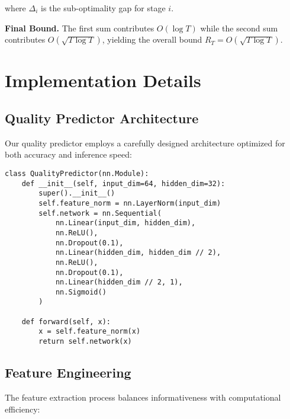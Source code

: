 \documentclass{article}
\theoremstyle{plain}
\theoremstyle{definition}
\theoremstyle{remark}
\begin{document}
where $\Delta_i$ is the sub-optimality gap for stage $i$.

\textbf{Final Bound.} The first sum contributes $O(\log T)$ while the second sum contributes $O(\sqrt{T \log T})$, yielding the overall bound $R_T = O(\sqrt{T \log T})$.

\section{Implementation Details}
\label{app:implementation}

\subsection{Quality Predictor Architecture}

Our quality predictor employs a carefully designed architecture optimized for both accuracy and inference speed:

\begin{verbatim}
class QualityPredictor(nn.Module):
    def __init__(self, input_dim=64, hidden_dim=32):
        super().__init__()
        self.feature_norm = nn.LayerNorm(input_dim)
        self.network = nn.Sequential(
            nn.Linear(input_dim, hidden_dim),
            nn.ReLU(),
            nn.Dropout(0.1),
            nn.Linear(hidden_dim, hidden_dim // 2),
            nn.ReLU(),
            nn.Dropout(0.1),
            nn.Linear(hidden_dim // 2, 1),
            nn.Sigmoid()
        )
    
    def forward(self, x):
        x = self.feature_norm(x)
        return self.network(x)
\end{verbatim}

\subsection{Feature Engineering}

The feature extraction process balances informativeness with computational efficiency:
\end{document}
